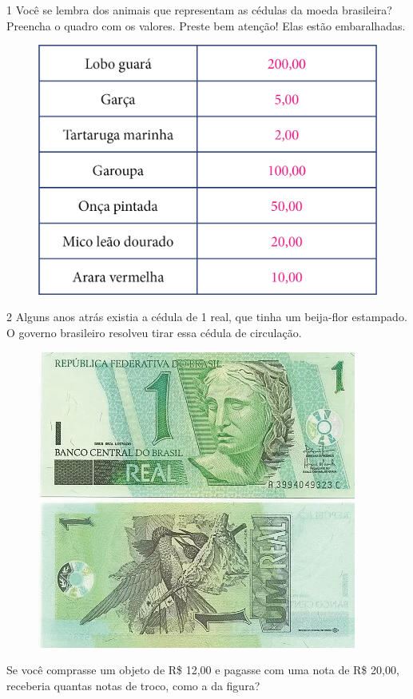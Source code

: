 
\num{1} Você se lembra dos animais que representam as cédulas da moeda
brasileira? Preencha o quadro com os valores. Preste bem atenção!
Elas estão embaralhadas.

\begin{figure}[htpb!]
\centering
\includegraphics[width=.7\textwidth]{./media/image63.png}
\end{figure}


\pagebreak
\num{2} Alguns anos atrás existia a cédula de 1 real, que tinha um beija-flor
estampado. O governo brasileiro resolveu tirar essa cédula de circulação.


\begin{figure}[htpb!]
\centering
\includegraphics[width=.4\textwidth]{./media/image64.png}
\end{figure}

Se você comprasse um objeto de R\$ 12,00 e pagasse com uma nota de R\$
20,00, receberia quantas notas de troco, como a da figura?

